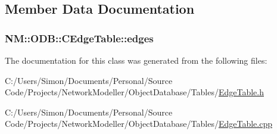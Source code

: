 \subsection{Member Data Documentation}
\hypertarget{class_n_m_1_1_o_d_b_1_1_c_edge_table_a13626344aef11255b5c5e3538613854f}{}
\subsubsection[{edges}]{ N\+M\+::\+O\+D\+B\+::\+C\+Edge\+Table\+::edges}\label{class_n_m_1_1_o_d_b_1_1_c_edge_table_a13626344aef11255b5c5e3538613854f}


The documentation for this class was generated from the following files\+:\begin{DoxyCompactItemize}
\item 
C\+:/\+Users/\+Simon/\+Documents/\+Personal/\+Source Code/\+Projects/\+Network\+Modeller/\+Object\+Database/\+Tables/\hyperlink{_edge_table_8h}{Edge\+Table.\+h}\item 
C\+:/\+Users/\+Simon/\+Documents/\+Personal/\+Source Code/\+Projects/\+Network\+Modeller/\+Object\+Database/\+Tables/\hyperlink{_edge_table_8cpp}{Edge\+Table.\+cpp}\end{DoxyCompactItemize}
